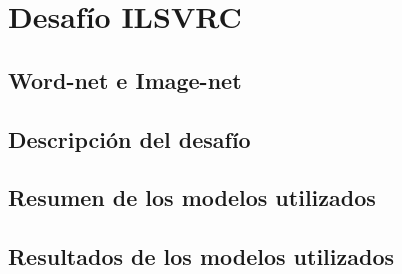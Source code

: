 \section{Desafío ILSVRC}

\subsection{Word-net e Image-net}
\subsection{Descripción del desafío}
\subsection{Resumen de los modelos utilizados}
\subsection{Resultados de los modelos utilizados}